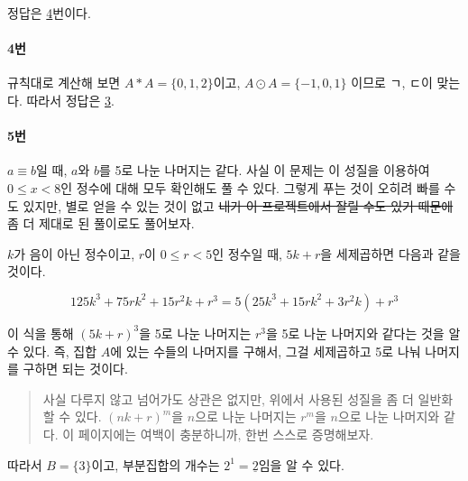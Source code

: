 \documentclass{article}
\begin{document}
정답은 \underline{4}번이다.

\paragraph{4번}
규칙대로 계산해 보면 $A * A = \{0, 1, 2\}$이고, $A \odot A = \{-1, 0, 1\}$ 이므로 ㄱ, ㄷ이 맞는다. 따라서 정답은 \underline{3}.

\paragraph{5번}
$a \equiv b$일 때, $a$와 $b$를 5로 나눈 나머지는 같다. 사실 이 문제는 이 성질을 이용하여 $0 \le x < 8$인 정수에 대해 모두 확인해도 풀 수 있다. 그렇게 푸는 것이 오히려 빠를 수도 있지만, 별로 얻을 수 있는 것이 없고 \sout{내가 이 프로젝트에서 잘릴 수도 있기 때문에} 좀 더 제대로 된 풀이로도 풀어보자. \newline

$k$가 음이 아닌 정수이고, $r$이 $0 \le r < 5$인 정수일 때, $5k + r$을 세제곱하면 다음과 같을 것이다.

\[
125k^3 + 75rk^2 + 15r^{2}k + r^3 = 5(25k^3 + 15rk^2 + 3r^{2}k) + r^3
\]

이 식을 통해 $(5k + r)^3$을 5로 나눈 나머지는 $r^3$을 5로 나눈 나머지와 같다는 것을 알 수 있다. 즉, 집합 $A$에 있는 수들의 나머지를 구해서, 그걸 세제곱하고 5로 나눠 나머지를 구하면 되는 것이다. \newline

\begin{quote}
    사실 다루지 않고 넘어가도 상관은 없지만, 위에서 사용된 성질을 좀 더 일반화할 수 있다. $(nk + r)^m$을 $n$으로 나눈 나머지는 $r^m$을 $n$으로 나눈 나머지와 같다. 이 페이지에는 여백이 충분하니까, 한번 스스로 증명해보자.
\end{quote}

따라서 $B = \{3\}$이고, 부분집합의 개수는 $2^1 = \underline{2}$임을 알 수 있다.
\end{document}
